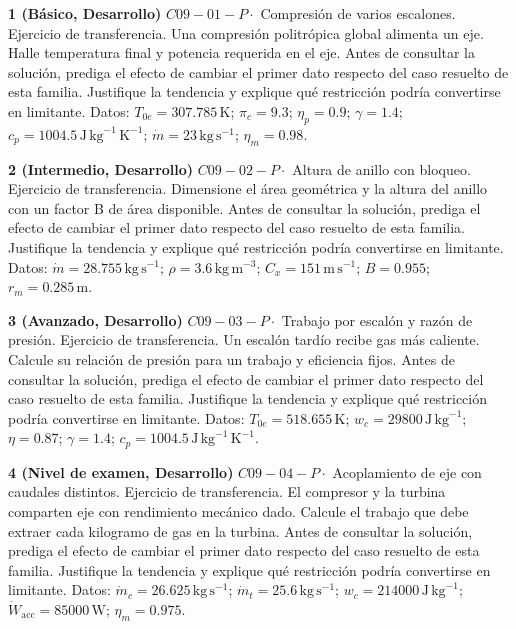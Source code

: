 \documentclass[10pt,openany]{book}
\begin{document}
\begin{tcolorbox}[title={Ejercicios propuestos}, studiumworked, breakable]

\noindent\textbf{1 (Básico, Desarrollo)}
\(C09-01-P \cdot\) Compresión de varios escalones. Ejercicio de transferencia. Una compresión politrópica global alimenta un eje. Halle temperatura final y potencia requerida en el eje. Antes de consultar la solución, prediga el efecto de cambiar el primer dato respecto del caso resuelto de esta familia. Justifique la tendencia y explique qué restricción podría convertirse en limitante. Datos: \(T_{0e}=307.785\, \mathrm{K}\); \(\pi_c=9.3\); \(\eta_p=0.9\); \(\gamma=1.4\); \(c_p=1004.5\, \mathrm{J}\,\mathrm{kg}^{-1}\,\mathrm{K}^{-1}\); \(\dot m=23\, \mathrm{kg}\,\mathrm{s}^{-1}\); \(\eta_m=0.98\).

\noindent\textbf{2 (Intermedio, Desarrollo)}
\(C09-02-P \cdot\) Altura de anillo con bloqueo. Ejercicio de transferencia. Dimensione el área geométrica y la altura del anillo con un factor B de área disponible. Antes de consultar la solución, prediga el efecto de cambiar el primer dato respecto del caso resuelto de esta familia. Justifique la tendencia y explique qué restricción podría convertirse en limitante. Datos: \(\dot m=28.755\, \mathrm{kg}\,\mathrm{s}^{-1}\); \(\rho=3.6\, \mathrm{kg}\,\mathrm{m}^{-3}\); \(C_x=151\, \mathrm{m}\,\mathrm{s}^{-1}\); \(B=0.955\); \(r_m=0.285\, \mathrm{m}\).

\noindent\textbf{3 (Avanzado, Desarrollo)}
\(C09-03-P \cdot\) Trabajo por escalón y razón de presión. Ejercicio de transferencia. Un escalón tardío recibe gas más caliente. Calcule su relación de presión para un trabajo y eficiencia fijos. Antes de consultar la solución, prediga el efecto de cambiar el primer dato respecto del caso resuelto de esta familia. Justifique la tendencia y explique qué restricción podría convertirse en limitante. Datos: \(T_{0e}=518.655\, \mathrm{K}\); \(w_c=29800\, \mathrm{J}\,\mathrm{kg}^{-1}\); \(\eta=0.87\); \(\gamma=1.4\); \(c_p=1004.5\, \mathrm{J}\,\mathrm{kg}^{-1}\,\mathrm{K}^{-1}\).

\noindent\textbf{4 (Nivel de examen, Desarrollo)}
\(C09-04-P \cdot\) Acoplamiento de eje con caudales distintos. Ejercicio de transferencia. El compresor y la turbina comparten eje con rendimiento mecánico dado. Calcule el trabajo que debe extraer cada kilogramo de gas en la turbina. Antes de consultar la solución, prediga el efecto de cambiar el primer dato respecto del caso resuelto de esta familia. Justifique la tendencia y explique qué restricción podría convertirse en limitante. Datos: \(\dot{m}_c=26.625\, \mathrm{kg}\,\mathrm{s}^{-1}\); \(\dot{m}_t=25.6\, \mathrm{kg}\,\mathrm{s}^{-1}\); \(w_c=214000\, \mathrm{J}\,\mathrm{kg}^{-1}\); \(\dot{W}_{\mathrm{acc}}=85000\, \mathrm{W}\); \(\eta_m=0.975\).
\end{tcolorbox}
\end{document}
